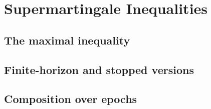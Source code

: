 
\section{Supermartingale Inequalities}
\label{p3:apx:supermartingale}

\subsection{The maximal inequality}
\label{p3:sub:apx_maximal_inequality}

\subsection{Finite-horizon and stopped versions}
\label{p3:sub:apx_finite_horizon}

\subsection{Composition over epochs}
\label{p3:sub:apx_composition_over_epochs}
